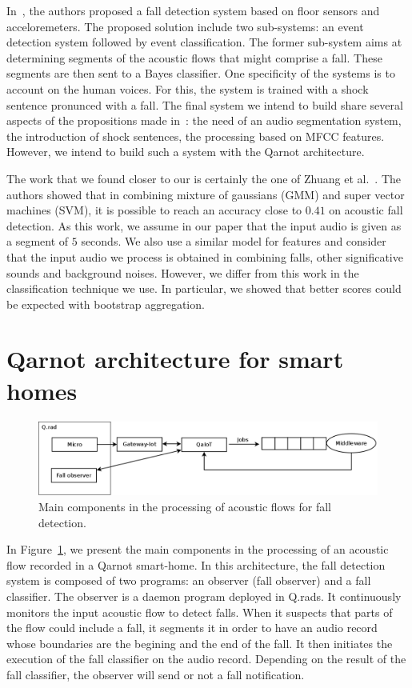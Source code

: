 \documentclass[10pt, conference, compsocconf]{IEEEtran}
\begin{document}
In~\cite{Zigel5223652}, the authors proposed a fall detection system based on floor sensors and acceloremeters. The proposed solution  
include two sub-systems: an event detection system followed by event classification. The former sub-system aims at determining 
segments of the acoustic flows that might comprise a fall. These segments are then sent to a Bayes classifier. One specificity 
of the systems is to account on the human voices. For this, the system is trained with a shock sentence pronunced with a fall.
The final system we intend to build share several aspects of the propositions made in~\cite{Zigel5223652}: the need of an audio segmentation 
system, the introduction of shock sentences, the processing based on MFCC features. However, we intend to build such a system with 
the Qarnot architecture. 


The work that we found closer to our is certainly the one of Zhuang et al.~\cite{Zhuang4959522}. The authors showed that in 
combining mixture of gaussians (GMM) and super vector machines (SVM), it is possible to reach an accuracy close to $0.41$ on 
acoustic fall detection. As this work, we assume in our paper that the input audio is given as a segment of $5$ seconds. We also
use a similar model for features and consider that the input audio we process is obtained in combining falls, other significative 
sounds and background noises. However, we differ from this work in the classification technique we use. In particular, we showed 
that better scores could be expected with bootstrap aggregation. 

      
 

\section{Qarnot architecture for smart homes} \label{Smart}

	\begin{figure}[hbtp]
	\centering
        \includegraphics[scale=0.17]{./Figures/gateway.png}
	\caption{Main components in the processing of acoustic flows for fall detection.}
	\label{fig:flow}
	\end{figure}

In Figure~\ref{fig:flow}, we present the main components in the processing of an acoustic flow recorded in a Qarnot smart-home. 
In this architecture, the fall detection system is composed of two programs: an observer (fall observer) and a fall classifier. 
The observer is a daemon program deployed in Q.rads. It continuously monitors the input acoustic flow to detect falls. 
When it suspects that parts of the flow could include a fall, it segments it in order to have an audio record whose boundaries 
are the begining and the end of the fall. It then initiates the execution of the fall 
classifier on the  audio record. Depending on the result of the fall classifier, the observer will send or not a 
fall notification.  
\end{document}
